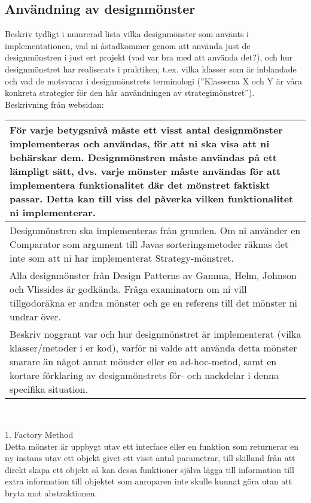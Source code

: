 \subsection{Användning av designmönster}
{\color{red}Beskriv tydligt i numrerad lista vilka designmönster som använts i implementationen, vad ni åstadkommer genom att använda just de designmönstren i just ert projekt (vad var bra med att använda det?), och hur designmönstret har realiserats i praktiken, t.ex. vilka klasser som är inblandade och vad de motsvarar i designmönstrets terminologi (”Klasserna X och Y är våra konkreta strategier för den här användningen av strategimönstret”).\\
Beskrivning från websidan:\\
\begin{tabular}{| p{11cm} |}
    \hline
    För varje betygsnivå måste ett visst antal designmönster implementeras och användas, för att ni ska visa att ni behärskar dem. Designmönstren måste användas på ett lämpligt sätt, dvs. varje mönster måste användas för att implementera funktionalitet där det mönstret faktiskt passar. Detta kan till viss del påverka vilken funktionalitet ni implementerar. \\ \hline
    Designmönstren ska implementeras från grunden. Om ni använder en Comparator som argument till Javas sorteringsmetoder räknas det inte som att ni har implementerat Strategy-mönstret. \\ \hline
    Alla designmönster från Design Patterns av Gamma, Helm, Johnson och Vlissides är godkända. Fråga examinatorn om ni vill tillgodoräkna er andra mönster och ge en referens till det mönster ni undrar över. \\ \hline
    Beskriv noggrant var och hur designmönstret är implementerat (vilka klasser/metoder i er kod), varför ni valde att använda detta mönster snarare än något annat mönster eller en ad-hoc-metod, samt en kortare förklaring av designmönstrets för- och nackdelar i denna specifika situation. \\ \hline
\end{tabular}\\}
\vspace{11pt}
1. Factory Method\\
Detta mönster är uppbygt utav ett interface eller en funktion som returnerar en ny instans utav ett objekt givet ett visst antal parametrar, till skilland från att direkt skapa ett objekt så kan dessa funktioner själva lägga till information till extra information till objektet som anroparen inte skulle kunnat göra utan att bryta mot abstraktionen.\\
